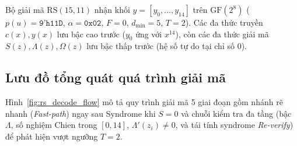 \documentclass[11pt,a4paper]{report}
\begin{document}
Bộ giải mã $\text{RS}(15,11)$ nhận khối $y = [y_0, \dots, y_{14}]$ trên $\text{GF}(2^8)$ ($p(u) = \texttt{9'h11D}$, $\alpha = \texttt{0x02}$, $F = 0$, $d_{\min} = 5$, $T = 2$). Các đa thức truyền $c(x), y(x)$ lưu bậc cao trước ($y_0$ ứng với $x^{14}$), còn các đa thức giải mã $S(z), \Lambda(z), \Omega(z)$ lưu bậc thấp trước (hệ số tự do tại chỉ số $0$).

\subsection{Lưu đồ tổng quát quá trình giải mã}

Hình~\ref{fig:rs_decode_flow} mô tả quy trình giải mã 5 giai đoạn gồm nhánh rẽ nhanh (\textit{Fast-path}) ngay sau Syndrome khi $S = 0$ và chuỗi kiểm tra đa tầng (bậc $\Lambda$, số nghiệm Chien trong $[0,14]$, $\Lambda'(z_i) \neq 0$, và tái tính syndrome \textit{Re-verify}) để phát hiện vượt ngưỡng $T = 2$.
\end{document}
